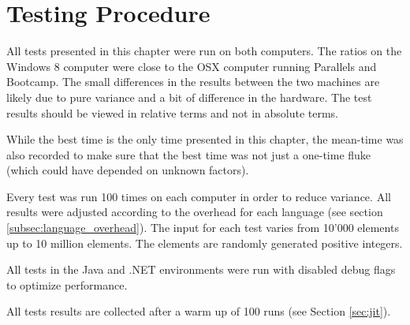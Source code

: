 \section{Testing Procedure}
All tests presented in this chapter were run on both computers. The ratios on the Windows 8 computer were close to the OSX computer running Parallels and Bootcamp. The small differences in the results between the two machines are likely due to pure variance and a bit of difference in the hardware. The test results should be viewed in relative terms and not in absolute terms.

While the best time is the only time presented in this chapter, the mean-time was also recorded to make sure that the best time was not just a one-time fluke (which could have depended on unknown factors).

Every test was run 100 times on each computer in order to reduce variance. All results were adjusted according to the overhead for each language (see section \ref{subsec:language_overhead}). The input for each test varies from 10'000 elements up to 10 million elements. The elements are randomly generated positive integers.

All tests in the Java and .NET environments were run with disabled debug flags to optimize performance.

All tests results are collected after a warm up of 100 runs (see Section \ref{sec:jit}).
